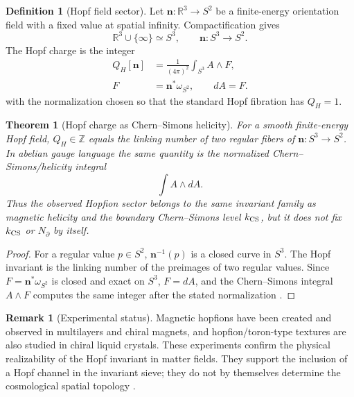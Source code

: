 \documentclass[aps,prd,reprint,nofootinbib,superscriptaddress,floatfix]{revtex4-2}
\numberwithin{equation}{section}
\theoremstyle{definition}
\newtheorem{definition}{Definition}[section]
\newtheorem{remark}{Remark}[section]
\theoremstyle{plain}
\newtheorem{theorem}{Theorem}[section]
\begin{document}
\begin{definition}[Hopf field sector]
Let \(\mathbf n:\mathbb R^3\to S^2\) be a finite-energy orientation
field with a fixed value at spatial infinity.  Compactification gives
\[
\mathbb R^3\cup\{\infty\}\simeq S^3,
\qquad
\mathbf n:S^3\to S^2 .
\]
The Hopf charge is the integer
\begin{align}
Q_H[\mathbf n]
&=
\frac{1}{(4\pi)^2}
\int_{S^3} A\wedge F,
\\
F&=\mathbf n^*\omega_{S^2},
\qquad dA=F .
\end{align}
with the normalization chosen so that the standard Hopf fibration has
\(Q_H=1\).
\end{definition}

\begin{theorem}[Hopf charge as Chern--Simons helicity]
For a smooth finite-energy Hopf field, \(Q_H\in\mathbb Z\) equals the
linking number of two regular fibers of \(\mathbf n:S^3\to S^2\).  In
abelian gauge language the same quantity is the normalized
Chern--Simons/helicity integral
\[
\int A\wedge dA .
\]
Thus the observed Hopfion sector belongs to the same invariant family as
magnetic helicity and the boundary Chern--Simons level \(k_{\rm CS}\),
but it does not fix \(k_{\rm CS}\) or \(N_\partial\) by itself.
\end{theorem}

\begin{proof}
For a regular value \(p\in S^2\), \(\mathbf n^{-1}(p)\) is a closed
curve in \(S^3\).  The Hopf invariant is the linking number of the
preimages of two regular values.  Since \(F=\mathbf n^*\omega_{S^2}\)
is closed and exact on \(S^3\), \(F=dA\), and the Chern--Simons integral
\(A\wedge F\) computes the same integer after the stated normalization \cite{Ranada1989,Moffatt1969,Urbantke2003}.
\end{proof}

\begin{remark}[Experimental status]
Magnetic hopfions have been created and observed in multilayers and
chiral magnets, and hopfion/toron-type textures are also studied in
chiral liquid crystals.  These experiments confirm the physical
realizability of the Hopf invariant in matter fields.  They support the
inclusion of a Hopf channel in the invariant sieve; they do not by
themselves determine the cosmological spatial topology
\cite{Kent2021,Zheng2023,Ackerman2015}.
\end{remark}
\end{document}
